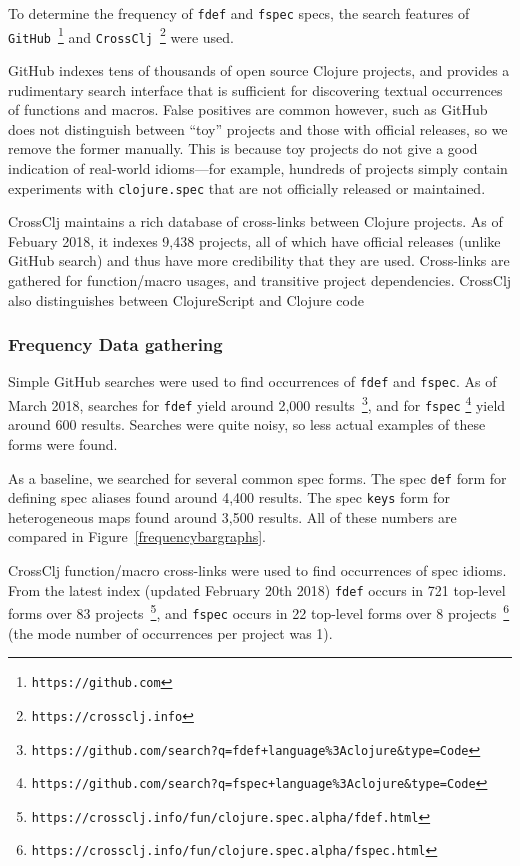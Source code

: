 To determine the frequency of \texttt{fdef} and \texttt{fspec} specs,
the search features of \texttt{GitHub}~\footnote{\texttt{https://github.com}} and 
\texttt{CrossClj}~\footnote{\texttt{https://crossclj.info}} were used.

GitHub indexes tens of thousands of open source Clojure projects, and provides
a rudimentary search interface that is sufficient for discovering textual occurrences 
of functions and macros. False positives are common however, such as
GitHub does not distinguish
between ``toy'' projects and those with official releases, so we remove the former manually.
This is because toy projects do not give a good indication of real-world idioms---for example,
hundreds of projects simply contain experiments with \texttt{clojure.spec} that
are not officially released or maintained.

CrossClj maintains a rich database of cross-links between Clojure projects.
As of Febuary 2018, it indexes 9,438 projects, all of which have official releases (unlike
GitHub search) and thus have more credibility that they are used.
Cross-links are gathered for function/macro usages, and transitive project dependencies.
CrossClj also distinguishes between ClojureScript and Clojure code

\subsubsection{Frequency Data gathering}

Simple GitHub searches were used to find occurrences of \texttt{fdef} and \texttt{fspec}.
As of March 2018,
searches for \texttt{fdef}
yield around 2,000 results~\footnote{\texttt{https://github.com/search?q=fdef+language\%3Aclojure\&type=Code}},
and for \texttt{fspec} 
\footnote{\texttt{https://github.com/search?q=fspec+language\%3Aclojure\&type=Code}}
yield around 600 results.
Searches were quite noisy, so less actual examples of these forms were found.

As a baseline, we searched for several common spec forms.
The spec \texttt{def} form for defining spec aliases found around 4,400 results.
The spec \texttt{keys} form for heterogeneous maps found around 3,500 results.
All of these numbers are compared in Figure~\ref{frequencybargraphs}.

CrossClj function/macro cross-links were used to find occurrences of spec idioms.
From the latest index (updated February 20th 2018)
\texttt{fdef} occurs in 721 top-level forms over 83 
projects~\footnote{\texttt{https://crossclj.info/fun/clojure.spec.alpha/fdef.html}}, and
\texttt{fspec} occurs in 22 top-level forms over 8 
projects~\footnote{\texttt{https://crossclj.info/fun/clojure.spec.alpha/fspec.html}}
(the mode number of occurrences per project was 1).

